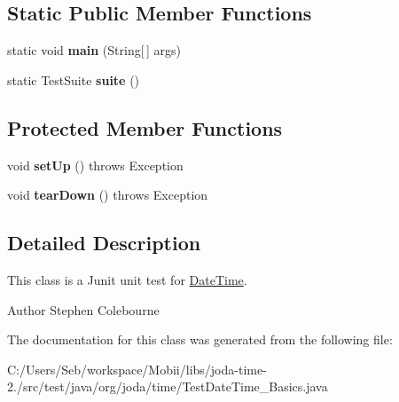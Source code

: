 \subsection*{Static Public Member Functions}
\begin{DoxyCompactItemize}
\item 
\hypertarget{classorg_1_1joda_1_1time_1_1_test_date_time___basics_a9782247b15de9c60d9a780a42d77b208}{static void {\bfseries main} (String\mbox{[}$\,$\mbox{]} args)}\label{classorg_1_1joda_1_1time_1_1_test_date_time___basics_a9782247b15de9c60d9a780a42d77b208}

\item 
\hypertarget{classorg_1_1joda_1_1time_1_1_test_date_time___basics_af3c51b3870122f8ce9bbc33c0e85b82f}{static Test\-Suite {\bfseries suite} ()}\label{classorg_1_1joda_1_1time_1_1_test_date_time___basics_af3c51b3870122f8ce9bbc33c0e85b82f}

\end{DoxyCompactItemize}
\subsection*{Protected Member Functions}
\begin{DoxyCompactItemize}
\item 
\hypertarget{classorg_1_1joda_1_1time_1_1_test_date_time___basics_a46b6bfd5db3a7251d8fa4285fd253ab9}{void {\bfseries set\-Up} ()  throws Exception }\label{classorg_1_1joda_1_1time_1_1_test_date_time___basics_a46b6bfd5db3a7251d8fa4285fd253ab9}

\item 
\hypertarget{classorg_1_1joda_1_1time_1_1_test_date_time___basics_aeac896461f4f2d717f9746774c0a3518}{void {\bfseries tear\-Down} ()  throws Exception }\label{classorg_1_1joda_1_1time_1_1_test_date_time___basics_aeac896461f4f2d717f9746774c0a3518}

\end{DoxyCompactItemize}


\subsection{Detailed Description}
This class is a Junit unit test for \hyperlink{classorg_1_1joda_1_1time_1_1_date_time}{Date\-Time}.

\begin{DoxyAuthor}{Author}
Stephen Colebourne 
\end{DoxyAuthor}


The documentation for this class was generated from the following file\-:\begin{DoxyCompactItemize}
\item 
C\-:/\-Users/\-Seb/workspace/\-Mobii/libs/joda-\/time-\/2./src/test/java/org/joda/time/Test\-Date\-Time\-\_\-\-Basics.\-java\end{DoxyCompactItemize}

